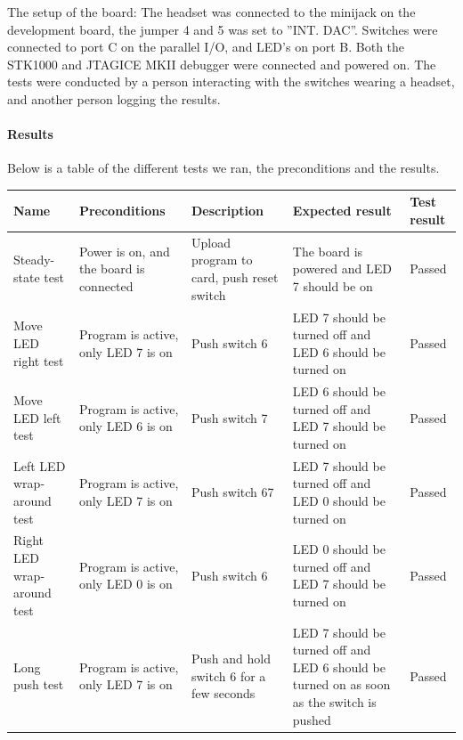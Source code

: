 \documentclass[a4paper,11pt]{article}
\begin{document}
The setup of the board: 
The headset was connected to the minijack on the development board, the jumper 4 and 5 was set to ''INT. DAC''.
Switches were connected to port C on the parallel I/O, and LED's on port B. 
Both the STK1000 and JTAGICE MKII debugger were connected and powered on. The tests were conducted by a person interacting with the switches wearing a headset, and another person logging the results.

\paragraph{Results}
Below is a table of the different tests we ran, the preconditions and the results.
\linebreak

\renewcommand{\arraystretch}{1.25} %
\begin{tabular}[pos]{|m{70pt}|m{90pt}|m{90pt}|m{100pt}|m{60pt}|}
\hline
\textbf{Name} 				& \textbf{Preconditions}				& \textbf{Description} 					& \textbf{Expected result} 													& \textbf{Test result} 		\\ \hline

Steady-state test			& Power is on, and the board is connected & Upload program to card, push reset switch 	& The board is powered and LED 7 should be on 									& Passed 				\\ \hline

Move LED right test			& Program is active, only LED 7 is on 		& Push switch 6						 	& LED 7 should be turned off and LED 6 should be turned on 							& Passed 				\\ \hline

Move LED left test			& Program is active, only LED 6 is on 		& Push switch 7						 	& LED 6 should be turned off and LED 7 should be turned on 							& Passed 				\\ \hline

Left LED wrap-around test		& Program is active, only LED 7 is on 		& Push switch 67					 	& LED 7 should be turned off and LED 0 should be turned on 							& Passed 				\\ \hline

Right LED wrap-around test	& Program is active, only LED 0 is on 		& Push switch 6						 	& LED 0 should be turned off and LED 7 should be turned on 							& Passed 				\\ \hline

Long push test				& Program is active, only LED 7 is on 		& Push and hold switch 6 for a few seconds 	& LED 7 should be turned off and LED 6 should be turned on as soon as the switch is pushed 	& Passed 				\\ \hline
\end{tabular}
\end{document}

